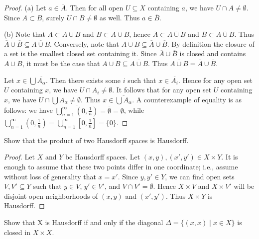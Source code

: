 \documentclass[12pt,twoside,openany]{memoir}
\begin{document}
    \begin{proof}
        (a) Let $a \in \overline{A}$. Then for all open $U \subseteq X$ containing $a$, we have $U \cap A \neq \emptyset$. Since $A \subset B$, surely $U \cap B \neq \emptyset$ as well. Thus $a \in \overline{B}$.

        (b) Note that $A \subset A \cup B$ and $B \subset A \cup B$, hence $\overline{A} \subset \overline{A \cup B}$ and $\overline{B} \subset \overline{A \cup B}$. Thus $\overline{A} \cup \overline{B} \subseteq \overline{A \cup B}$. Conversely, note that $A \cup B \subseteq \overline{A} \cup \overline{B}$. By definition the closure of a set is the smallest closed set containing it. Since $\overline{A} \cup \overline{B}$ is closed and contains $A \cup B$, it must be the case that $A \cup B \subseteq \overline{A \cup B}$. Thus $\overline{A \cup B} = \overline{A} \cup \overline{B}$.

        Let $x \in \bigcup \overline{A_\alpha}$. Then there exists some $i$ such that $x \in \overline{A_i}$. Hence for any open set $U$ containing $x$, we have $U \cap A_i \neq \emptyset$. It follows that for any open set $U$ containing $x$, we have $U \cap \bigcup A_\alpha \neq \emptyset$. Thus $x \in \overline{\bigcup A_\alpha}$. A counterexample of equality is as follows: we have $\overline{\bigcup_{n = 1}^\infty (0,\frac{1}{n})} = \overline{\emptyset} = \emptyset$, while $\bigcup_{n = 1}^\infty \overline{(0,\frac{1}{n})} = \bigcup_{n = 1}^\infty [0,\frac{1}{n}] = \{0\}$.
    \end{proof}
\begin{exercise}[manual-num={11}]
Show that the product of two Hausdorff spaces is Hausdorff.
\end{exercise}
    \begin{proof}
        Let $X$ and $Y$ be Hausdorff spaces. Let $(x,y),(x',y') \in X \times Y$. It is enough to assume that these two points differ in one coordinate; i.e., assume without loss of generality that $x = x'$. Since $y,y' \in Y$, we can find open sets $V,V' \subseteq Y$ such that $y \in V$, $y' \in V'$, and $V \cap V' = \emptyset$. Hence $X \times V$ and $X \times V'$ will be disjoint open neighborhoods of $(x,y)$ and $(x',y')$. Thus $X \times Y$ is Hausdorff.
    \end{proof}
\begin{exercise}[manual-num={13}]
Show that X is Hausdorff if and only if the diagonal $\Delta = \{ (x,x) \mid x \in X\}$ is closed in $X \times X$.
\end{exercise}
\end{document}
